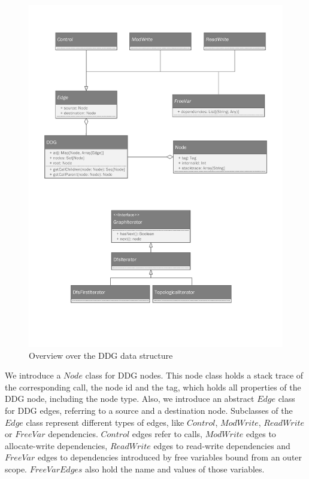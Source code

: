 \begin{figure}
\begin{center}
\includegraphics[scale=0.7]{uml/DDG.pdf}
\end{center}
\caption{Overview over the DDG data structure}
\label{fig:framework_ddg}
\end{figure}

We introduce a $Node$ class for DDG nodes. This node class holds a stack trace of the corresponding call, the node id and the tag, which holds all properties of the DDG node, including the node type. Also, we introduce an abstract $Edge$ class for DDG edges, referring to a source and a destination node. Subclasses of the $Edge$ class represent different types of edges, like $Control$, $ModWrite$, $ReadWrite$ or $FreeVar$ dependencies. $Control$ edges refer to calls, $ModWrite$ edges to allocate-write dependencies, $ReadWrite$ edges to read-write dependencies and $FreeVar$ edges to dependencies introduced by free variables bound from an outer scope. $FreeVarEdges$ also hold the name and values of those variables.

